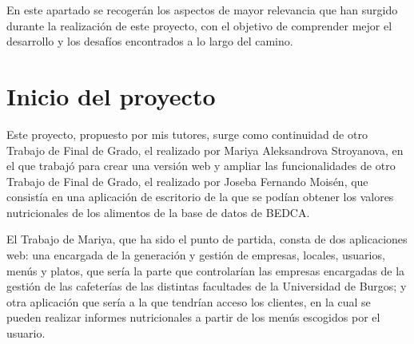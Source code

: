 
\begin{comment}
Este apartado pretende recoger los aspectos más interesantes del desarrollo del proyecto, comentados por los autores del mismo.
Debe incluir desde la exposición del ciclo de vida utilizado, hasta los detalles de mayor relevancia de las fases de análisis, diseño e implementación.
Se busca que no sea una mera operación de copiar y pegar diagramas y extractos del código fuente, sino que realmente se justifiquen los caminos de solución que se han tomado, especialmente aquellos que no sean triviales.
Puede ser el lugar más adecuado para documentar los aspectos más interesantes del diseño y de la implementación, con un mayor hincapié en aspectos tales como el tipo de arquitectura elegido, los índices de las tablas de la base de datos, normalización y desnormalización, distribución en ficheros3, reglas de negocio dentro de las bases de datos (EDVHV GH GDWRV DFWLYDV), aspectos de desarrollo relacionados con el WWW...
Este apartado, debe convertirse en el resumen de la experiencia práctica del proyecto, y por sí mismo justifica que la memoria se convierta en un documento útil, fuente de referencia para los autores, los tutores y futuros alumnos.
\end{comment}

En este apartado se recogerán los aspectos de mayor relevancia que han surgido durante la realización de este proyecto, con el objetivo de comprender mejor el desarrollo y los desafíos encontrados a lo largo del camino.

\section{Inicio del proyecto}

Este proyecto, propuesto por mis tutores, surge como continuidad de otro Trabajo de Final de Grado, el realizado por Mariya Aleksandrova Stroyanova, en el que trabajó para crear una versión web y ampliar las funcionalidades de otro Trabajo de Final de Grado, el realizado por Joseba Fernando Moisén, que consistía en una aplicación de escritorio de la que se podían obtener los valores nutricionales de los alimentos de la base de datos de BEDCA. 

El Trabajo de Mariya, que ha sido el punto de partida, consta de dos aplicaciones web: una encargada de la generación y gestión de empresas, locales, usuarios, menús y platos, que sería la parte que controlarían las empresas encargadas de la gestión de las cafeterías de las distintas facultades de la Universidad de Burgos; y otra aplicación que sería a la que tendrían acceso los clientes, en la cual se pueden realizar informes nutricionales a partir de los menús escogidos por el usuario.

